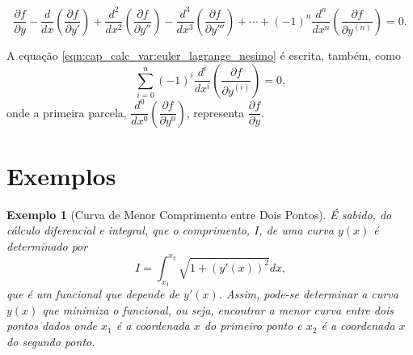 \documentclass[
	12pt,				%
	openright,			%
    twoside,			%
	a4paper,			%
	english,			%
	french,				%
	spanish,			%
	brazil				%
	]{abntex2}
\newtheorem{exemplo}{Exemplo}
\numberwithin{lema}{chapter}
\numberwithin{teorema}{chapter}
\numberwithin{definicao}{chapter}
\numberwithin{exemplo}{chapter}
\numberwithin{figure}{chapter}
\begin{document}
\begin{equation}
	\label{eqn:cap_calc_var:euler_lagrange_nesimo}
	\frac{\partial f}{\partial y}
	- \frac{d}{dx}\left ( \frac{\partial f}{\partial y'} \right )
	+ \frac{d^2}{dx^2}\left ( \frac{\partial f}{\partial y''} \right )
	- \frac{d^3}{dx^3}\left ( \frac{\partial f}{\partial y'''} \right )
	+ \cdots
	+ (-1)^n \frac{d^n}{dx^n}\left (\frac{\partial f}{\partial y^{(n)}} \right )
	= 0
	\text{.}
\end{equation}

A equação \eqref{eqn:cap_calc_var:euler_lagrange_nesimo} é escrita, também, como
$$
	\sum_{i=0}^n (-1)^i\frac{d^i}{dx^i}\left (
		\frac{\partial f}{\partial y^{(i)}}
	\right )
	= 0
	\text{,}
$$
onde a primeira parcela, $\dfrac{d^0}{dx^0} \left ( \dfrac{\partial f}{\partial y^0} \right )$, representa $\dfrac{\partial f}{\partial y}$.




\section{Exemplos}
\label{sec:calcvar_exemplos}

\begin{exemplo}[Curva de Menor Comprimento entre Dois Pontos]
	É sabido, do cálculo diferencial e integral, que o comprimento, $I$, de uma curva $y(x)$ é determinado por
	\begin{equation}
		\label{eqn:ex_reta_funcional}
		I=\int_{x_1}^{x_2}\sqrt{1+(y'(x))^2}dx
		\text{,}
	\end{equation}
	que é um funcional que depende de $y'(x)$. Assim, pode-se determinar a curva $y(x)$ que minimiza o funcional, ou seja, encontrar a menor curva entre dois pontos dados onde $x_1$ é a coordenada $x$ do primeiro ponto e $x_2$ é a coordenada $x$ do segundo ponto.
\end{exemplo}
\end{document}
